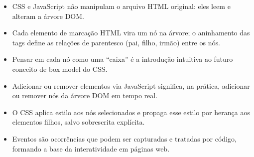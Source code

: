 \begin{itemize}
  \item CSS e JavaScript não manipulam o arquivo HTML original: eles leem e alteram a árvore DOM.
\end{itemize}

\begin{itemize}
  \item Cada elemento de marcação HTML vira um nó na árvore; o aninhamento das tags define as relações de parentesco (pai, filho, irmão) entre os nós.
\end{itemize}

\begin{itemize}
  \item Pensar em cada nó como uma “caixa” é a introdução intuitiva ao futuro conceito de box model do CSS.
\end{itemize}

\begin{itemize}
  \item Adicionar ou remover elementos via JavaScript significa, na prática, adicionar ou remover nós da árvore DOM em tempo real.
\end{itemize}

\begin{itemize}
  \item O CSS aplica estilo aos nós selecionados e propaga esse estilo por herança aos elementos filhos, salvo sobrescrita explícita.
\end{itemize}

\begin{itemize}
  \item Eventos são ocorrências que podem ser capturadas e tratadas por código, formando a base da interatividade em páginas web.
\end{itemize}
